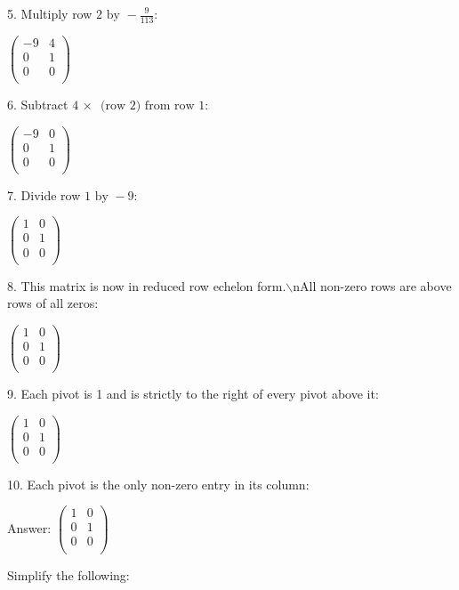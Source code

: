 \documentclass{article}
\begin{document}
5. Multiply row $2\text{ by }-\frac{9}{113}$:

$\left(
\begin{array}{cc}
-9 & 4 \\
 0 & 1 \\
 0 & 0 \\
\end{array}
\right)$

6. Subtract $4\, \times \,\text{ (row }2)\text{ from row }1:$

$\left(
\begin{array}{cc}
-9 & 0 \\
 0 & 1 \\
 0 & 0 \\
\end{array}
\right)$

7. Divide row $1\text{ by }-9:$

$\left(
\begin{array}{cc}
1 & 0 \\
 0 & 1 \\
 0 & 0 \\
\end{array}
\right)$

8. This matrix is now in reduced row echelon form.$\backslash $nAll non-zero rows are above rows of all zeros:

$\left(
\begin{array}{cc}
1 & 0 \\
 0 & 1 \\
 0 & 0 \\
\end{array}
\right)$

9. Each pivot is 1 and is strictly to the right of every pivot above it:

$\left(
\begin{array}{cc}
1 & 0 \\
 0 & 1 \\
 0 & 0 \\
\end{array}
\right)$

10. Each pivot is the only non-zero entry in its column:

Answer: $\left(
\begin{array}{cc}
1 & 0 \\
 0 & 1 \\
 0 & 0 \\
\end{array}
\right)$

\pagebreak

Simplify the following:
\end{document}
